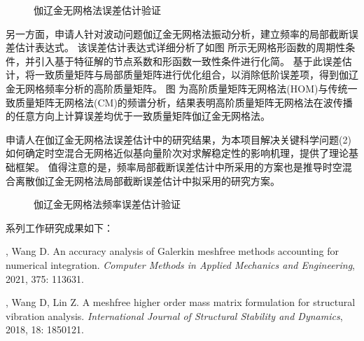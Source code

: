 \begin{figure}[!h]
    \centering 
    \caption{伽辽金无网格法误差估计验证}
    \label{fg:cube}
\end{figure}

另一方面，申请人针对波动问题伽辽金无网格法振动分析，建立频率的局部截断误差估计表达式。
该误差估计表达式详细分析了如图  所示无网格形函数的周期性条件，并引入基于特征解的节点系数和形函数一致性条件进行化简。
基于此误差估计，将一致质量矩阵与局部质量矩阵进行优化组合，以消除低阶误差项，得到伽辽金无网格频率分析的高阶质量矩阵。
图  为高阶质量矩阵无网格法(HOM)与传统一致质量矩阵无网格法(CM)的频谱分析，结果表明高阶质量矩阵无网格法在波传播的任意方向上计算误差均优于一致质量矩阵伽辽金无网格法。

申请人在伽辽金无网格法误差估计中的研究结果，为本项目解决关键科学问题(2)如何确定时空混合无网格近似基向量阶次对求解稳定性的影响机理，提供了理论基础框架。
值得注意的是，频率局部截断误差估计中所采用的方案也是推导时空混合离散伽辽金无网格法局部截断误差估计中拟采用的研究方案。

\vspace{16pt}
\begin{figure}[!h]
    \centering 
    \caption{伽辽金无网格法频率误差估计验证}
    \label{fg:frequency}
\end{figure}

\vspace{16pt}

系列工作研究成果如下：

\vspace{-50pt}
\begin{thebibliography}{1}
	, Wang D.
	\newblock An accuracy analysis of {{Galerkin}} meshfree methods accounting for
	  numerical integration.
	\newblock \emph{Computer Methods in Applied Mechanics and Engineering}, 2021,
	  375: 113631.

	, Wang D, Lin Z.
	\newblock A meshfree higher order mass matrix formulation for structural
	  vibration analysis.
	\newblock \emph{International Journal of Structural Stability and Dynamics},
	  2018, 18: 1850121.

\end{thebibliography}

